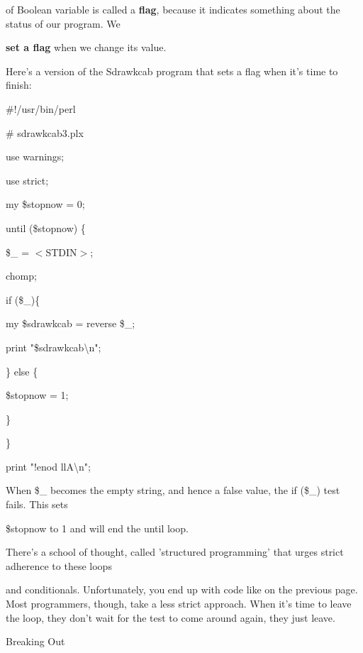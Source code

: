 \documentclass[a4paper,11pt]{book}
\begin{document}
\noindent of Boolean variable is called a \textbf{flag}, because it indicates something about the status of our program. We

\noindent \textbf{set a flag }when we change its value.

\noindent 

\noindent Here's a version of the Sdrawkcab program that sets a flag when it's time to finish:

\noindent 

\noindent 

\noindent \#!/usr/bin/perl

\noindent \# sdrawkcab3.plx

\noindent use warnings;

\noindent use strict;

\noindent 

\noindent my \$stopnow = 0;

\noindent until (\$stopnow) \{

\noindent \$\_  = $<$STDIN$>$;

\noindent chomp;

\noindent if (\$\_)\{ 

\noindent my \$sdrawkcab = reverse \$\_;

\noindent print "\$sdrawkcab\textbackslash n";

\noindent \} else \{

\noindent \$stopnow = 1;

\noindent \}

\noindent \}

\noindent print "!enod llA\textbackslash n";

\noindent 

\noindent When \$\_ becomes the empty string, and hence a false value, the if (\$\_) test fails. This sets

\noindent \$stopnow to 1 and will end the until loop.

\noindent 

\noindent 

\noindent There's a school of thought, called 'structured programming' that urges strict adherence to these loops

\noindent and conditionals. Unfortunately, you end up with code like on the previous page. Most programmers, though, take a less strict approach. When it's time to leave the loop, they don't wait for the test to come around again, they just leave.

\noindent 

\noindent Breaking Out
\end{document}
